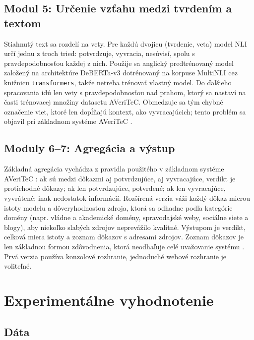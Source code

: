\documentclass[a4paper,11pt]{article}
\begin{document}
\subsection{Modul 5: Určenie vzťahu medzi tvrdením a textom}

Stiahnutý text sa rozdelí na vety. Pre každú dvojicu (tvrdenie, veta)
model NLI určí jednu z troch tried: potvrdzuje, vyvracia, nesúvisí,
spolu s pravdepodobnosťou každej z nich. Použije sa anglický predtrénovaný
model založený na architektúre DeBERTa-v3 \cite{he2023debertav3}
dotrénovaný na korpuse MultiNLI \cite{williams2018mnli} cez knižnicu
\texttt{transformers}, takže netreba trénovať vlastný model. Do ďalšieho
spracovania idú len vety s pravdepodobnosťou nad prahom, ktorý sa nastaví
na časti trénovacej množiny datasetu AVeriTeC. Obmedzuje sa tým chybné označenie viet, ktoré len
dopĺňajú kontext, ako vyvracajúcich; tento problém sa objavil pri
základnom systéme AVeriTeC \cite{schlichtkrull2023averitec}.

\subsection{Moduly 6--7: Agregácia a výstup}

Základná agregácia vychádza z pravidla použitého v základnom systéme
AVeriTeC \cite{schlichtkrull2023averitec}: ak sú medzi dôkazmi aj
potvrdzujúce, aj vyvracajúce, verdikt je protichodné dôkazy; ak len
potvrdzujúce, potvrdené; ak len vyvracajúce, vyvrátené; inak nedostatok
informácií. Rozšírená verzia váži každý dôkaz mierou istoty modelu
a dôveryhodnosťou zdroja, ktorá sa odhadne podľa kategórie domény (napr.
vládne a akademické domény, spravodajské weby, sociálne siete a blogy),
aby niekoľko slabých zdrojov neprevážilo kvalitné. Výstupom je verdikt,
celková miera istoty a zoznam dôkazov s adresami zdrojov. Zoznam dôkazov
je len základnou formou zdôvodnenia, ktorá neodhaľuje celé uvažovanie
systému \cite{guo2022survey}. Prvá verzia používa konzolové rozhranie,
jednoduché webové rozhranie je voliteľné.

\section{Experimentálne vyhodnotenie}

\subsection{Dáta}
\end{document}
